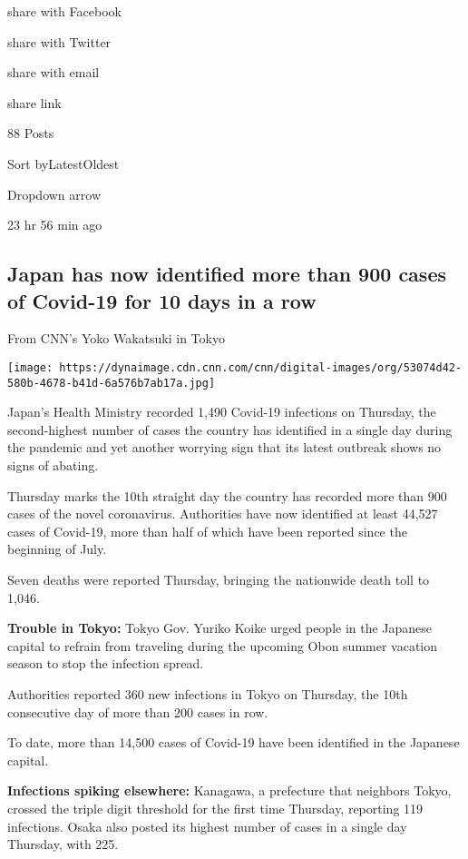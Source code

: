 share with Facebook

share with Twitter

share with email

share link

88 Posts

Sort byLatestOldest

Dropdown arrow

23 hr 56 min ago

\hypertarget{japan-has-now-identified-more-than-900-cases-of-covid-19-for-10-days-in-a-row}{%
\subsection{Japan has now identified more than 900 cases of Covid-19 for
10 days in a
row}\label{japan-has-now-identified-more-than-900-cases-of-covid-19-for-10-days-in-a-row}}

From CNN's Yoko Wakatsuki in Tokyo

\texttt{[image: https://dynaimage.cdn.cnn.com/cnn/digital-images/org/53074d42-580b-4678-b41d-6a576b7ab17a.jpg]}

Japan's Health Ministry recorded 1,490 Covid-19 infections on Thursday,
the second-highest number of cases the country has identified in a
single day during the pandemic and yet another worrying sign that its
latest outbreak shows no signs of abating.

Thursday marks the 10th straight day the country has recorded more than
900 cases of the novel coronavirus. Authorities have now identified at
least 44,527 cases of Covid-19, more than half of which have been
reported since the beginning of July.

Seven deaths were reported Thursday, bringing the nationwide death toll
to 1,046.

\textbf{Trouble in Tokyo:} Tokyo Gov. Yuriko Koike urged people in the
Japanese capital to refrain from traveling during the upcoming Obon
summer vacation season to stop the infection spread.

Authorities reported 360 new infections in Tokyo on Thursday, the 10th
consecutive day of more than 200 cases in row.

To date, more than 14,500 cases of Covid-19 have been identified in the
Japanese capital.

\textbf{Infections spiking elsewhere:} Kanagawa, a prefecture that
neighbors Tokyo, crossed the triple digit threshold for the first time
Thursday, reporting 119 infections. Osaka also posted its highest number
of cases in a single day Thursday, with 225.

